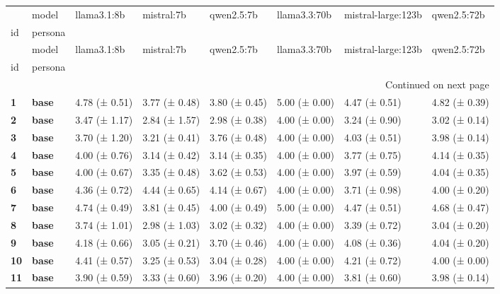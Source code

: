 \begin{longtable}{llllllll}
\toprule
 & model & llama3.1:8b & mistral:7b & qwen2.5:7b & llama3.3:70b & mistral-large:123b & qwen2.5:72b \\
id & persona &  &  &  &  &  &  \\
\midrule
\endfirsthead
\toprule
 & model & llama3.1:8b & mistral:7b & qwen2.5:7b & llama3.3:70b & mistral-large:123b & qwen2.5:72b \\
id & persona &  &  &  &  &  &  \\
\midrule
\endhead
\midrule
\multicolumn{8}{r}{Continued on next page} \\
\midrule
\endfoot
\bottomrule
\endlastfoot
\textbf{1} & \textbf{base} & 4.78 (± 0.51) & 3.77 (± 0.48) & 3.80 (± 0.45) & 5.00 (± 0.00) & 4.47 (± 0.51) & 4.82 (± 0.39) \\
\cline{1-8}
\textbf{2} & \textbf{base} & 3.47 (± 1.17) & 2.84 (± 1.57) & 2.98 (± 0.38) & 4.00 (± 0.00) & 3.24 (± 0.90) & 3.02 (± 0.14) \\
\cline{1-8}
\textbf{3} & \textbf{base} & 3.70 (± 1.20) & 3.21 (± 0.41) & 3.76 (± 0.48) & 4.00 (± 0.00) & 4.03 (± 0.51) & 3.98 (± 0.14) \\
\cline{1-8}
\textbf{4} & \textbf{base} & 4.00 (± 0.76) & 3.14 (± 0.42) & 3.14 (± 0.35) & 4.00 (± 0.00) & 3.77 (± 0.75) & 4.14 (± 0.35) \\
\cline{1-8}
\textbf{5} & \textbf{base} & 4.00 (± 0.67) & 3.35 (± 0.48) & 3.62 (± 0.53) & 4.00 (± 0.00) & 3.97 (± 0.59) & 4.04 (± 0.35) \\
\cline{1-8}
\textbf{6} & \textbf{base} & 4.36 (± 0.72) & 4.44 (± 0.65) & 4.14 (± 0.67) & 4.00 (± 0.00) & 3.71 (± 0.98) & 4.00 (± 0.20) \\
\cline{1-8}
\textbf{7} & \textbf{base} & 4.74 (± 0.49) & 3.81 (± 0.45) & 4.00 (± 0.49) & 5.00 (± 0.00) & 4.47 (± 0.51) & 4.68 (± 0.47) \\
\cline{1-8}
\textbf{8} & \textbf{base} & 3.74 (± 1.01) & 2.98 (± 1.03) & 3.02 (± 0.32) & 4.00 (± 0.00) & 3.39 (± 0.72) & 3.04 (± 0.20) \\
\cline{1-8}
\textbf{9} & \textbf{base} & 4.18 (± 0.66) & 3.05 (± 0.21) & 3.70 (± 0.46) & 4.00 (± 0.00) & 4.08 (± 0.36) & 4.04 (± 0.20) \\
\cline{1-8}
\textbf{10} & \textbf{base} & 4.41 (± 0.57) & 3.25 (± 0.53) & 3.04 (± 0.28) & 4.00 (± 0.00) & 4.21 (± 0.72) & 4.00 (± 0.00) \\
\cline{1-8}
\textbf{11} & \textbf{base} & 3.90 (± 0.59) & 3.33 (± 0.60) & 3.96 (± 0.20) & 4.00 (± 0.00) & 3.81 (± 0.60) & 3.98 (± 0.14) \\

\end{longtable}
